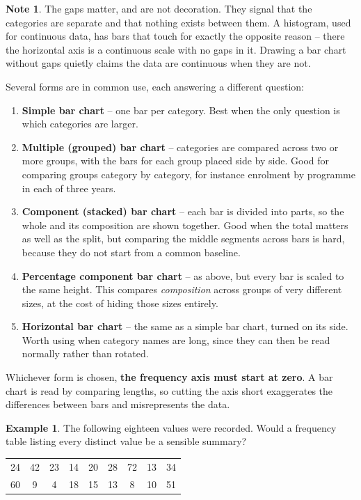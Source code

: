 \documentclass[11pt,a4paper]{article}
\theoremstyle{definition}
\newtheorem{example}[thm]{Example}
\newtheorem{note}[thm]{Note}
\begin{document}
\begin{note}
The gaps matter, and are not decoration. They signal that the categories are separate and
that nothing exists between them. A histogram, used for continuous data, has bars that
touch for exactly the opposite reason -- there the horizontal axis is a continuous scale
with no gaps in it. Drawing a bar chart without gaps quietly claims the data are
continuous when they are not.
\end{note}

Several forms are in common use, each answering a different question:

\begin{enumerate}
\item \textbf{Simple bar chart} -- one bar per category. Best when the only question is
which categories are larger.
\item \textbf{Multiple (grouped) bar chart} -- categories are compared across two or more
groups, with the bars for each group placed side by side. Good for comparing groups
category by category, for instance enrolment by programme in each of three years.
\item \textbf{Component (stacked) bar chart} -- each bar is divided into parts, so the
whole and its composition are shown together. Good when the total matters as well as the
split, but comparing the middle segments across bars is hard, because they do not start
from a common baseline.
\item \textbf{Percentage component bar chart} -- as above, but every bar is scaled to the
same height. This compares \emph{composition} across groups of very different sizes, at the
cost of hiding those sizes entirely.
\item \textbf{Horizontal bar chart} -- the same as a simple bar chart, turned on its side.
Worth using when category names are long, since they can then be read normally rather than
rotated.
\end{enumerate}

Whichever form is chosen, \textbf{the frequency axis must start at zero}. A bar chart is
read by comparing lengths, so cutting the axis short exaggerates the differences between
bars and misrepresents the data.

\begin{example}
The following eighteen values were recorded. Would a frequency table listing every distinct
value be a sensible summary?
\begin{table}[H]
\centering
\begin{tabular}{ccccccccc}
24 & 42 & 23 & 14 & 20 & 28 & 72 & 13 & 34\\
60 & 9  & 4  & 18 & 15 & 13 & 8  & 10 & 51\\
\end{tabular}
\end{table}
\end{example}
\end{document}
